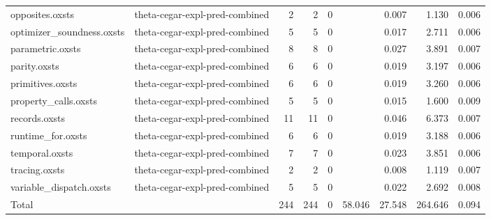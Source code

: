 \begin{tabular}{llrrrrrrr}
opposites.oxsts & theta-cegar-expl-pred-combined & 2 & 2 & 0 &  & 0.007 & 1.130 & 0.006 \\
optimizer\_soundness.oxsts & theta-cegar-expl-pred-combined & 5 & 5 & 0 &  & 0.017 & 2.711 & 0.006 \\
parametric.oxsts & theta-cegar-expl-pred-combined & 8 & 8 & 0 &  & 0.027 & 3.891 & 0.007 \\
parity.oxsts & theta-cegar-expl-pred-combined & 6 & 6 & 0 &  & 0.019 & 3.197 & 0.006 \\
primitives.oxsts & theta-cegar-expl-pred-combined & 6 & 6 & 0 &  & 0.019 & 3.260 & 0.006 \\
property\_calls.oxsts & theta-cegar-expl-pred-combined & 5 & 5 & 0 &  & 0.015 & 1.600 & 0.009 \\
records.oxsts & theta-cegar-expl-pred-combined & 11 & 11 & 0 &  & 0.046 & 6.373 & 0.007 \\
runtime\_for.oxsts & theta-cegar-expl-pred-combined & 6 & 6 & 0 &  & 0.019 & 3.188 & 0.006 \\
temporal.oxsts & theta-cegar-expl-pred-combined & 7 & 7 & 0 &  & 0.023 & 3.851 & 0.006 \\
tracing.oxsts & theta-cegar-expl-pred-combined & 2 & 2 & 0 &  & 0.008 & 1.119 & 0.007 \\
variable\_dispatch.oxsts & theta-cegar-expl-pred-combined & 5 & 5 & 0 &  & 0.022 & 2.692 & 0.008 \\
\midrule
Total &  & 244 & 244 & 0 & 58.046 & 27.548 & 264.646 & 0.094 \\
\bottomrule
\end{tabular}
